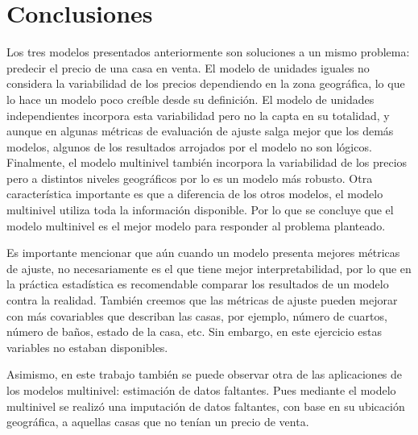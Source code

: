 
\section{Conclusiones}
\label{sec:conclusiones}

Los tres modelos presentados anteriormente son soluciones a un mismo problema: predecir el precio de una casa en venta. El modelo de unidades iguales no considera la variabilidad de los precios dependiendo en la zona geográfica, lo que lo hace un modelo poco creíble desde su definición. El modelo de unidades independientes incorpora esta variabilidad pero no la capta en su totalidad, y aunque en algunas métricas de evaluación de ajuste salga mejor que los demás modelos, algunos de los resultados arrojados por el modelo no son lógicos. Finalmente, el modelo multinivel también incorpora la variabilidad de los precios pero a distintos niveles geográficos por lo es un modelo más robusto. Otra característica importante es que a diferencia de los otros modelos, el modelo multinivel utiliza toda la información disponible. Por lo que se concluye que el modelo multinivel es el mejor modelo para responder al problema planteado.

Es importante mencionar que aún cuando un modelo presenta mejores métricas de ajuste, no necesariamente es el que tiene mejor interpretabilidad, por lo que en la práctica estadística es recomendable comparar los resultados de un modelo contra la realidad. También creemos que las métricas de ajuste pueden mejorar con más covariables que describan las casas, por ejemplo, número de cuartos, número de baños, estado de la casa, etc. Sin embargo, en este ejercicio estas variables no estaban disponibles.

Asimismo, en este trabajo también se puede observar otra de las aplicaciones de los modelos multinivel: estimación de datos faltantes. Pues mediante el modelo multinivel se realizó una imputación de datos faltantes, con base en su ubicación geográfica, a aquellas casas que no tenían un precio de venta.
